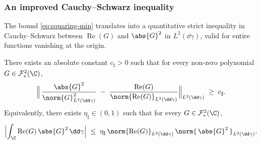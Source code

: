 \subsubsection{An improved Cauchy--Schwarz inequality}\label{sec:improved-CS}

The bound \eqref{eq:squaring-min} translates into a quantitative
strict inequality in Cauchy--Schwarz between $\operatorname{Re}(G)$ and
$\abs{G}^2$ in $L^2(\dd\gamma)$, valid for entire functions vanishing at
the origin.

\begin{theorem}\label{thm:improved-cs}
There exists an absolute constant $c_\sharp > 0$ such that for every
non-zero polynomial $G \in \mathcal{F}^2_\ast(\C)$,
\begin{equation}\label{eq:improved-cs}
\Bigl\|\, \frac{\abs{G}^2}{\norm{G}_{L^4(\dd\gamma)}^2}
\;-\; \frac{\operatorname{Re}(G)}{\norm{\operatorname{Re}(G)}_{L^2(\dd\gamma)}}
\Bigr\|_{L^2(\dd\gamma)}
\;\ge\; c_\sharp.
\end{equation}
Equivalently, there exists $\eta_\sharp \in (0,1)$ such that for every
$G \in \mathcal{F}^2_\ast(\C)$,
\begin{equation}\label{eq:cs-strict}
\Bigl| \int_{\C}\operatorname{Re}(G)\,\abs{G}^2\,\dd\gamma\Bigr|
\;\le\;
\eta_\sharp\, \norm{\operatorname{Re}(G)}_{L^2(\dd\gamma)}\,
\norm{\,\abs{G}^2\,}_{L^2(\dd\gamma)}.
\end{equation}
\end{theorem}

